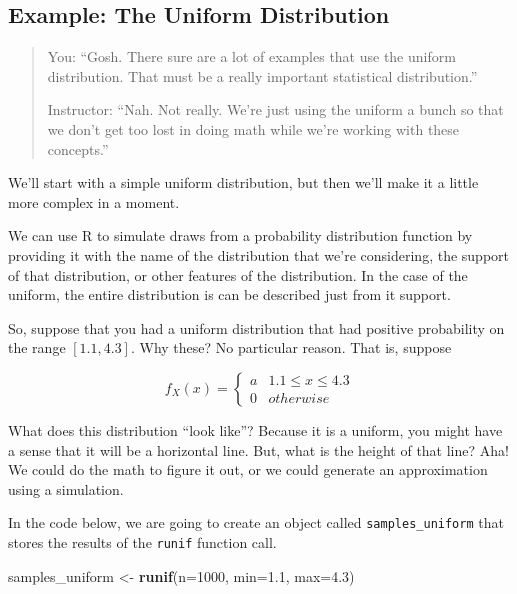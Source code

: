 \documentclass[
]{book}
\newenvironment{Shaded}{\begin{snugshade}}{\end{snugshade}}
\newcommand{\AttributeTok}[1]{\textcolor[rgb]{0.13,0.29,0.53}{#1}}
\newcommand{\DecValTok}[1]{\textcolor[rgb]{0.00,0.00,0.81}{#1}}
\newcommand{\FloatTok}[1]{\textcolor[rgb]{0.00,0.00,0.81}{#1}}
\newcommand{\FunctionTok}[1]{\textcolor[rgb]{0.13,0.29,0.53}{\textbf{#1}}}
\newcommand{\NormalTok}[1]{#1}
\newcommand{\OtherTok}[1]{\textcolor[rgb]{0.56,0.35,0.01}{#1}}
\theoremstyle{definition}
\theoremstyle{definition}
\theoremstyle{definition}
\theoremstyle{definition}
\theoremstyle{remark}
\begin{document}
\hypertarget{example-the-uniform-distribution}{%
\subsection{Example: The Uniform Distribution}\label{example-the-uniform-distribution}}

\begin{quote}
You: ``Gosh. There sure are a lot of examples that use the uniform distribution. That must be a really important statistical distribution.''

Instructor: ``Nah. Not really. We're just using the uniform a bunch so that we don't get too lost in doing math while we're working with these concepts.''
\end{quote}

We'll start with a simple uniform distribution, but then we'll make it a little more complex in a moment.

We can use R to simulate draws from a probability distribution function by providing it with the name of the distribution that we're considering, the support of that distribution, or other features of the distribution. In the case of the uniform, the entire distribution is can be described just from it support.

So, suppose that you had a uniform distribution that had positive probability on the range \([1.1, 4.3]\). Why these? No particular reason. That is, suppose

\[
  f_{X}(x) = \begin{cases} 
    a & 1.1 \leq x \leq 4.3 \\ 
    0 & otherwise
  \end{cases}
\]

What does this distribution ``look like''? Because it is a uniform, you might have a sense that it will be a horizontal line. But, what is the height of that line? Aha! We could do the math to figure it out, or we could generate an approximation using a simulation.

In the code below, we are going to create an object called \texttt{samples\_uniform} that stores the results of the \texttt{runif} function call.

\begin{Shaded}
\begin{Highlighting}[]
\NormalTok{samples\_uniform }\OtherTok{\textless{}{-}} \FunctionTok{runif}\NormalTok{(}\AttributeTok{n=}\DecValTok{1000}\NormalTok{, }\AttributeTok{min=}\FloatTok{1.1}\NormalTok{, }\AttributeTok{max=}\FloatTok{4.3}\NormalTok{)}
\end{Highlighting}
\end{Shaded}
\end{document}
